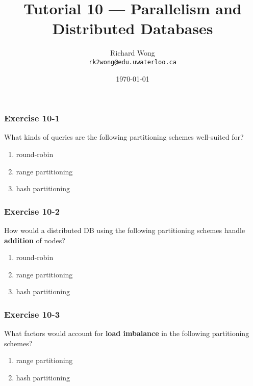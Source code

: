 

\def\ojoin{\setbox0=\hbox{$\bowtie$}%
  \rule[-.02ex]{.25em}{.4pt}\llap{\rule[\ht0]{.25em}{.4pt}}}
\def\leftouterjoin{\mathbin{\ojoin\mkern-5.8mu\bowtie}}

\title{Tutorial 10 --- Parallelism and Distributed Databases }

\author{Richard Wong \\ \small \texttt{rk2wong@edu.uwaterloo.ca}}
\date{\today}




\begin{frame}
  \titlepage

\end{frame}


\begin{frame}
\frametitle{Exercise 10-1}

What kinds of queries are the following partitioning schemes well-suited for?

\begin{enumerate}
  \item round-robin
  \item range partitioning
  \item hash partitioning
\end{enumerate}

\end{frame}


\begin{frame}
\frametitle{Exercise 10-2}

How would a distributed DB using the following partitioning schemes handle \textbf{addition} of nodes?

\begin{enumerate}
  \item round-robin
  \item range partitioning
  \item hash partitioning
\end{enumerate}

\end{frame}


\begin{frame}
\frametitle{Exercise 10-3}

What factors would account for \textbf{load imbalance} in the following partitioning schemes?

\begin{enumerate}
  \item range partitioning
  \item hash partitioning
\end{enumerate}

\end{frame}


